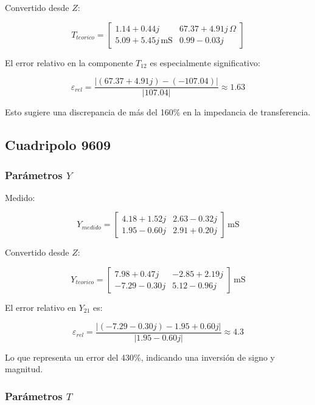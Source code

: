 Convertido desde $Z$:


\[
T_{teorico} =
\begin{bmatrix}
1.14 + 0.44j & 67.37 + 4.91j\,\Omega \\
5.09 + 5.45j\,\mathrm{mS} & 0.99 - 0.03j
\end{bmatrix}
\]



El error relativo en la componente $T_{12}$ es especialmente significativo:



\[
\varepsilon_{rel} = \frac{|(67.37 + 4.91j) - (-107.04)|}{|107.04|} \approx 1.63
\]



Esto sugiere una discrepancia de más del 160\% en la impedancia de transferencia.

\subsection{Cuadripolo 9609}

\subsubsection*{Parámetros $Y$}

Medido:


\[
Y_{medido} =
\begin{bmatrix}
4.18 + 1.52j & 2.63 - 0.32j \\
1.95 - 0.60j & 2.91 + 0.20j
\end{bmatrix} \,\mathrm{mS}
\]



Convertido desde $Z$:


\[
Y_{teorico} =
\begin{bmatrix}
7.98 + 0.47j & -2.85 + 2.19j \\
-7.29 - 0.30j & 5.12 - 0.96j
\end{bmatrix} \,\mathrm{mS}
\]



El error relativo en $Y_{21}$ es:



\[
\varepsilon_{rel} = \frac{|(-7.29 - 0.30j) - 1.95 + 0.60j|}{|1.95 - 0.60j|} \approx 4.3
\]



Lo que representa un error del 430\%, indicando una inversión de signo y magnitud.

\subsubsection*{Parámetros $T$}

